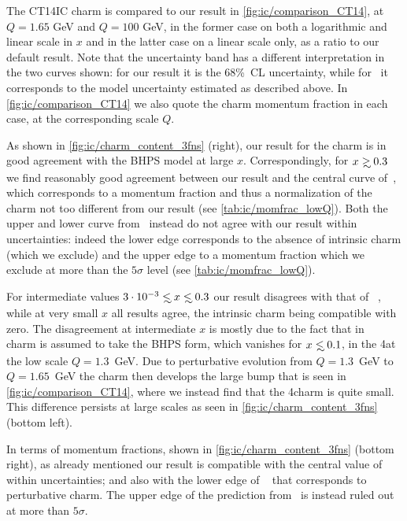 The CT14IC charm \pdf is compared to our result in
\cref{fig:ic/comparison_CT14}, at  $Q=1.65$ GeV and $Q=100$ GeV, in
the former case on both a logarithmic and linear scale in $x$ and in
the latter case on a linear scale only, as a ratio to our default
result.
%
Note that the uncertainty band has a different interpretation in the
two curves shown: for our result it is the 68\%~CL \pdf uncertainty,
while for~\cite{Hou:2017khm}  it corresponds to the model
uncertainty estimated as described above.
%
In \cref{fig:ic/comparison_CT14} we also quote
the charm momentum fraction in each case, at the corresponding scale $Q$. 

As shown in \cref{fig:ic/charm_content_3fns} (right), our result for
the charm \pdf is in good agreement with the BHPS model at large
$x$. Correspondingly, for $x\gsim 0.3$
we find reasonably good agreement between our
result and the central curve of~\cite{Hou:2017khm}, which
corresponds to a momentum fraction and thus a normalization of the charm
\pdf not too different from our result (see \cref{tab:ic/momfrac_lowQ}).
%
Both the upper and lower curve from~\cite{Hou:2017khm} instead
do not agree with our result within uncertainties: indeed the
lower edge corresponds to the absence of intrinsic charm (which we
exclude) and the upper edge to a momentum fraction which we exclude
at more than the $5\sigma$ level (see \cref{tab:ic/momfrac_lowQ}). 

For intermediate values $3\cdot10^{-3}\lsim x\lsim 0.3$  our result disagrees
with that of 
~\cite{Hou:2017khm}, while at very small $x$ all results agree,
the intrinsic charm being compatible with zero.
The disagreement at intermediate $x$ is mostly due
to the fact that in ~\cite{Hou:2017khm} charm is assumed to take
the BHPS form, which vanishes for $x\lsim 0.1$,
in the 4\fns at the low scale $Q=1.3$~GeV.
%
Due to perturbative evolution from  $Q=1.3$~GeV to $Q=1.65$~GeV the charm 
\pdf then develops the large bump that is
seen in \cref{fig:ic/comparison_CT14}, where we instead find that 
the 4\fns charm \pdf is quite small.
%
This difference persists at large scales as seen  in
\cref{fig:ic/charm_content_3fns} (bottom left).

In terms of momentum fractions, shown in \cref{fig:ic/charm_content_3fns} (bottom right),
as already mentioned our result is
compatible with the central value of~\cite{Hou:2017khm} within
uncertainties; and also with the lower edge of ~\cite{Hou:2017khm}
that corresponds to perturbative charm.
%
The upper edge  of the prediction from~\cite{Hou:2017khm} is instead
ruled out at more than $5\sigma$. 
